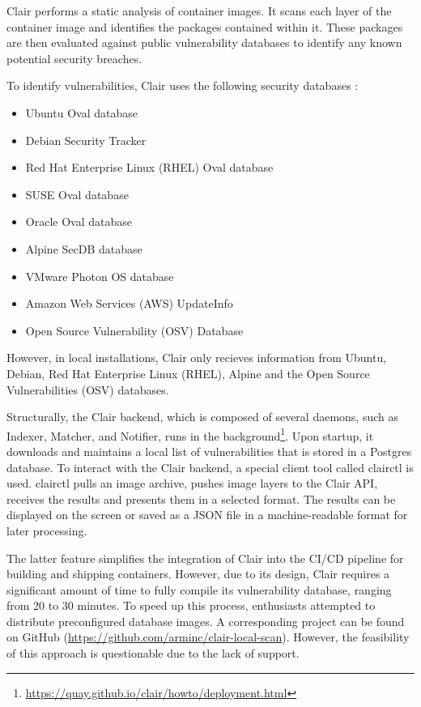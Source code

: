 Clair performs a static analysis of container images. It scans each layer of the container image and identifies the packages contained within it. These packages are then evaluated against public vulnerability databases to identify any known potential security breaches. 

To identify vulnerabilities, Clair uses the following security databases \cite{s:clair-intro2}:

\begin{itemize}
    \item Ubuntu Oval database
    \item Debian Security Tracker
    \item Red Hat Enterprise Linux (RHEL) Oval database
    \item SUSE Oval database
    \item Oracle Oval database
    \item Alpine SecDB database
    \item VMware Photon OS database
    \item Amazon Web Services (AWS) UpdateInfo
    \item Open Source Vulnerability (OSV) Database
\end{itemize}

However, in local installations, Clair only recieves information from Ubuntu, Debian, Red Hat Enterprise Linux (RHEL), Alpine and the Open Source Vulnerabilities (OSV) databases.

Structurally, the Clair backend, which is composed of several daemons, such as Indexer, Matcher, and Notifier, runs in the background\footnote{\url{https://quay.github.io/clair/howto/deployment.html}}. Upon startup, it downloads and maintains a local list of vulnerabilities that is stored in a Postgres database. To interact with the Clair backend, a special client tool called clairctl is used. clairctl pulls an image archive, pushes image layers to the Clair API, receives the results and presents them in a selected format. The results can be displayed on the screen or saved as a JSON file in a machine-readable format for later processing.

The latter feature simplifies the integration of Clair into the CI/CD pipeline for building and shipping containers. However, due to its design, Clair requires a significant amount of time to fully compile its vulnerability database, ranging from 20 to 30 minutes. To speed up this process, enthusiasts attempted to distribute preconfigured database images. A corresponding project can be found on GitHub (\url{https://github.com/arminc/clair-local-scan}). However, the feasibility of this approach is questionable due to the lack of support.

